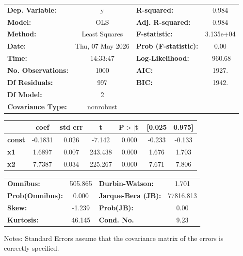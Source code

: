 \begin{center}
\begin{tabular}{lclc}
\toprule
\textbf{Dep. Variable:}    &        y         & \textbf{  R-squared:         } &     0.984   \\
\textbf{Model:}            &       OLS        & \textbf{  Adj. R-squared:    } &     0.984   \\
\textbf{Method:}           &  Least Squares   & \textbf{  F-statistic:       } & 3.135e+04   \\
\textbf{Date:}             & Thu, 07 May 2026 & \textbf{  Prob (F-statistic):} &     0.00    \\
\textbf{Time:}             &     14:33:47     & \textbf{  Log-Likelihood:    } &   -960.68   \\
\textbf{No. Observations:} &        1000      & \textbf{  AIC:               } &     1927.   \\
\textbf{Df Residuals:}     &         997      & \textbf{  BIC:               } &     1942.   \\
\textbf{Df Model:}         &           2      & \textbf{                     } &             \\
\textbf{Covariance Type:}  &    nonrobust     & \textbf{                     } &             \\
\bottomrule
\end{tabular}
\begin{tabular}{lcccccc}
               & \textbf{coef} & \textbf{std err} & \textbf{t} & \textbf{P$> |$t$|$} & \textbf{[0.025} & \textbf{0.975]}  \\
\midrule
\textbf{const} &      -0.1831  &        0.026     &    -7.142  &         0.000        &       -0.233    &       -0.133     \\
\textbf{x1}    &       1.6897  &        0.007     &   243.438  &         0.000        &        1.676    &        1.703     \\
\textbf{x2}    &       7.7387  &        0.034     &   225.267  &         0.000        &        7.671    &        7.806     \\
\bottomrule
\end{tabular}
\begin{tabular}{lclc}
\textbf{Omnibus:}       & 505.865 & \textbf{  Durbin-Watson:     } &     1.701  \\
\textbf{Prob(Omnibus):} &   0.000 & \textbf{  Jarque-Bera (JB):  } & 77816.813  \\
\textbf{Skew:}          &  -1.239 & \textbf{  Prob(JB):          } &      0.00  \\
\textbf{Kurtosis:}      &  46.145 & \textbf{  Cond. No.          } &      9.23  \\
\bottomrule
\end{tabular}
\end{center}

Notes: \newline
 [1] Standard Errors assume that the covariance matrix of the errors is correctly specified.